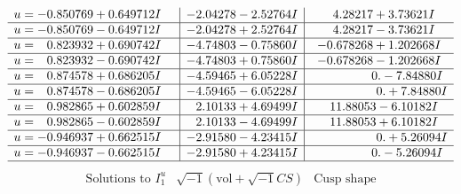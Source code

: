 \documentclass[1p]{elsarticle_modified}
\theoremstyle{definition}
\newcommand{\I}{\sqrt{-1}}
\begin{document}
$$\begin{array}{c|c|c}
\begin{aligned}
u &= -0.850769 + 0.649712 I\end{aligned}
 & -2.04278 - 2.52764 I & \phantom{-}4.28217 + 3.73621 I \\ \hline\begin{aligned}
u &= -0.850769 - 0.649712 I\end{aligned}
 & -2.04278 + 2.52764 I & \phantom{-}4.28217 - 3.73621 I \\ \hline\begin{aligned}
u &= \phantom{-}0.823932 + 0.690742 I\end{aligned}
 & -4.74803 - 0.75860 I & -0.678268 + 1.202668 I \\ \hline\begin{aligned}
u &= \phantom{-}0.823932 - 0.690742 I\end{aligned}
 & -4.74803 + 0.75860 I & -0.678268 - 1.202668 I \\ \hline\begin{aligned}
u &= \phantom{-}0.874578 + 0.686205 I\end{aligned}
 & -4.59465 + 6.05228 I & \phantom{-0.000000 } 0. - 7.84880 I \\ \hline\begin{aligned}
u &= \phantom{-}0.874578 - 0.686205 I\end{aligned}
 & -4.59465 - 6.05228 I & \phantom{-0.000000 -}0. + 7.84880 I \\ \hline\begin{aligned}
u &= \phantom{-}0.982865 + 0.602859 I\end{aligned}
 & \phantom{-}2.10133 + 4.69499 I & \phantom{-}11.88053 - 6.10182 I \\ \hline\begin{aligned}
u &= \phantom{-}0.982865 - 0.602859 I\end{aligned}
 & \phantom{-}2.10133 - 4.69499 I & \phantom{-}11.88053 + 6.10182 I \\ \hline\begin{aligned}
u &= -0.946937 + 0.662515 I\end{aligned}
 & -2.91580 - 4.23415 I & \phantom{-0.000000 -}0. + 5.26094 I \\ \hline\begin{aligned}
u &= -0.946937 - 0.662515 I\end{aligned}
 & -2.91580 + 4.23415 I & \phantom{-0.000000 } 0. - 5.26094 I\\
 \hline 
 \end{array}$$\newpage$$\begin{array}{c|c|c}  
\text{Solutions to }I^u_{1}& \I (\text{vol} + \sqrt{-1}CS) & \text{Cusp shape}\\

\end{array}$$
\end{document}
